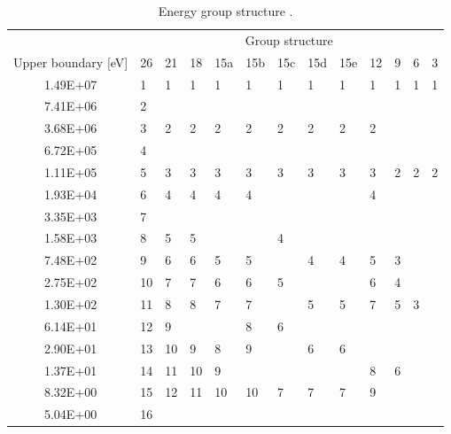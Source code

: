 \begin{table}[htbp!]
  \centering
  \caption{Energy group structure \cite{iaea_evaluation_2003}.}
  \begin{tabular}{c|llllllllllll}
  \toprule
                      & \multicolumn{12}{c}{Group structure} \\
  Upper boundary [eV] & 26    & 21   & 18   & 15a & 15b & 15c & 15d & 15e   & 12  & 9  & 6  & 3 \\
  \midrule
  1.49E+07            & 1     & 1    & 1    & 1   & 1   & 1   & 1   & 1     & 1   & 1  & 1  & 1 \\ 
  7.41E+06            & 2     &      &      &     &     &     &     &       &     &    &    &   \\ 
  3.68E+06            & 3     & 2    & 2    & 2   & 2   & 2   & 2   & 2     & 2   &    &    &   \\ 
  6.72E+05            & 4     &      &      &     &     &     &     &       &     &    &    &   \\ 
  1.11E+05            & 5     & 3    & 3    & 3   & 3   & 3   & 3   & 3     & 3   & 2  & 2  & 2 \\ 
  1.93E+04            & 6     & 4    & 4    & 4   & 4   &     &     &       & 4   &    &    &   \\ 
  3.35E+03            & 7     &      &      &     &     &     &     &       &     &    &    &   \\ 
  1.58E+03            & 8     & 5    & 5    &     &     & 4   &     &       &     &    &    &   \\ 
  7.48E+02            & 9     & 6    & 6    & 5   & 5   &     & 4   & 4     & 5   & 3  &    &   \\ 
  2.75E+02            & 10    & 7    & 7    & 6   & 6   & 5   &     &       & 6   & 4  &    &   \\ 
  1.30E+02            & 11    & 8    & 8    & 7   & 7   &     & 5   & 5     & 7   & 5  & 3  &   \\ 
  6.14E+01            & 12    & 9    &      &     & 8   & 6   &     &       &     &    &    &   \\ 
  2.90E+01            & 13    & 10   & 9    & 8   & 9   &     & 6   & 6     &     &    &    &   \\ 
  1.37E+01            & 14    & 11   & 10   & 9   &     &     &     &       & 8   & 6  &    &   \\ 
  8.32E+00            & 15    & 12   & 11   & 10  & 10  & 7   & 7   & 7     & 9   &    &    &   \\ 
  5.04E+00            & 16    &      &      &     &     &     &     &       &     &    &    &   \\ 

\end{tabular}
\end{table}

